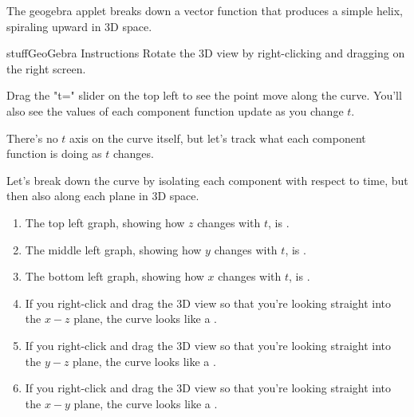 \documentclass{ximera}
\begin{document}
\begin{problem}
The geogebra applet breaks down a vector function that produces a simple helix, spiraling upward in 3D space.

\begin{expandable}{stuff}{GeoGebra Instructions}
    Rotate the 3D view by right-clicking and dragging on the right screen. 
    
    Drag the "t=" slider on the top left to see the point move along the curve. You'll also see the values of each component function update as you change $t$.
\end{expandable}

\begin{center}
\end{center}

There's no $t$ axis on the curve itself, but let's track what each component function is doing as $t$ changes.

Let's break down the curve by isolating each component with respect to time, but then also along each plane in 3D space.

\begin{enumerate}

\item The top left graph, showing how $z$ changes with $t$, is .

\item The middle left graph, showing how $y$ changes with $t$, is .

\item The bottom left graph, showing how $x$ changes with $t$, is .

\item If you right-click and drag the 3D view so that you're looking straight into the $x-z$ plane, the curve looks like a .

\item If you right-click and drag the 3D view so that you're looking straight into the $y-z$ plane, the curve looks like a .

\item If you right-click and drag the 3D view so that you're looking straight into the $x-y$ plane, the curve looks like a .

\end{enumerate}

\end{problem}
\end{document}
